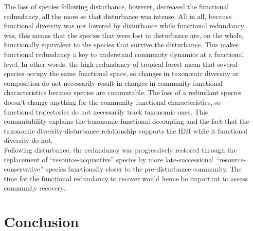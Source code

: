 \documentclass[fleqn,10pt]{ArtEcoFoG} %
\begin{document}
The loss of species following disturbance, however, decreased the
functional redundancy, all the more so that disturbance was intense. All
in all, because functional diversity was not lowered by disturbance
while functional redundancy was, this means that the species that were
lost in disturbance are, on the whole, functionally equivalent to the
species that survive the disturbance. This makes functional redundancy a
key to understand community dynamics at a functional level. In other
words, the high redundancy of tropical forest mean that several species
occupy the same functional space, so changes in taxonomic diversity or
composition do not necessarily result in changes in community functional
characteristics because species are commutable. The loss of a redundant
species doesn't change anything for the community functional
characteristics, so functional trajectories do not necessarily track
taxonomic ones. This commutability explains the taxonomic-functional
decoupling and the fact that the taxonomic diversity-disturbance
relationship supports the IDH while it functional diversity do not.\\
Following disturbance, the redundancy was progressively restored through
the replacement of ``resource-acquisitive'' species by more
late-successional ``resource-conservative'' species functionally closer
to the pre-disturbance community. The time for the functional redundancy
to recover would hence be important to assess community recovery.
\color{black}

\section{Conclusion}\label{conclusion}
\end{document}
